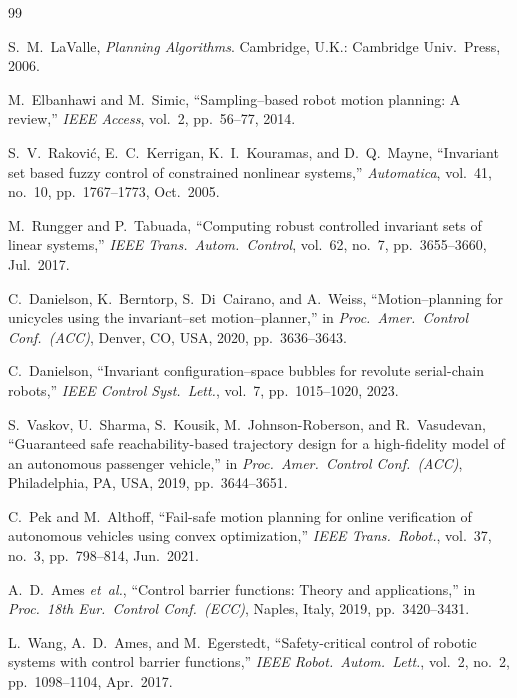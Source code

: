 \documentclass[conference]{IEEEtran}
\begin{document}
\begin{thebibliography}{99}

S.~M.~LaValle, \emph{Planning Algorithms}.  
Cambridge, U.K.: Cambridge Univ.~Press, 2006.

M.~Elbanhawi and M.~Simic, ``Sampling--based robot motion planning: A review,'' 
\emph{IEEE Access}, vol.~2, pp.~56--77, 2014.

S.~V.~Rakovi{\'c}, E.~C.~Kerrigan, K.~I.~Kouramas, and D.~Q.~Mayne,  
``Invariant set based fuzzy control of constrained nonlinear systems,''  
\emph{Automatica}, vol.~41, no.~10, pp.~1767--1773, Oct.~2005.

M.~Rungger and P.~Tabuada, ``Computing robust controlled invariant sets of linear systems,''  
\emph{IEEE Trans.\ Autom.\ Control}, vol.~62, no.~7, pp.~3655--3660, Jul.~2017.

C.~Danielson, K.~Berntorp, S.~Di~Cairano, and A.~Weiss,  
``Motion--planning for unicycles using the invariant--set motion--planner,''  
in \emph{Proc.\ Amer.\ Control Conf.\ (ACC)}, Denver, CO, USA, 2020,  
pp.~3636--3643.

C.~Danielson, ``Invariant configuration--space bubbles for revolute serial-chain robots,''  
\emph{IEEE Control Syst.\ Lett.}, vol.~7, pp.~1015--1020, 2023.

S.~Vaskov, U.~Sharma, S.~Kousik, M.~Johnson-Roberson, and R.~Vasudevan,  
``Guaranteed safe reachability-based trajectory design for a high-fidelity model of an autonomous passenger vehicle,''  
in \emph{Proc.\ Amer.\ Control Conf.\ (ACC)}, Philadelphia, PA, USA, 2019,  
pp.~3644--3651.

C.~Pek and M.~Althoff, ``Fail-safe motion planning for online verification of autonomous vehicles using convex optimization,''  
\emph{IEEE Trans.\ Robot.}, vol.~37, no.~3, pp.~798--814, Jun.~2021.

A.~D.~Ames \emph{et~al.}, ``Control barrier functions: Theory and applications,''  
in \emph{Proc.\ 18th Eur.\ Control Conf.\ (ECC)}, Naples, Italy, 2019,  
pp.~3420--3431.

L.~Wang, A.~D.~Ames, and M.~Egerstedt,  
``Safety-critical control of robotic systems with control barrier functions,''  
\emph{IEEE Robot.\ Autom.\ Lett.}, vol.~2, no.~2, pp.~1098--1104, Apr.~2017.

\end{thebibliography}
\end{document}
